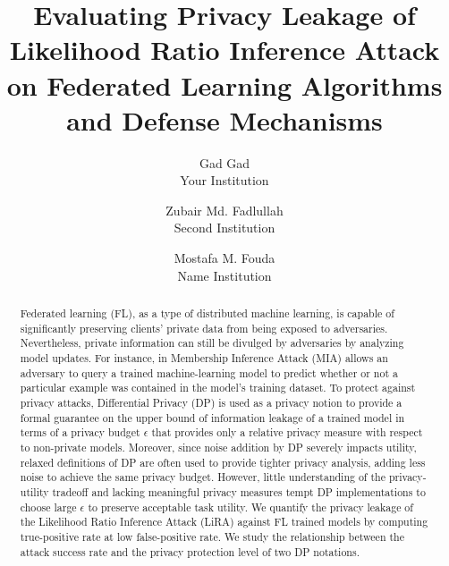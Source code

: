 \usepackage{amssymb}




\date{}

\title{\Large \bf Evaluating Privacy Leakage of Likelihood Ratio Inference Attack on Federated Learning Algorithms and Defense Mechanisms}

\author{
{\rm Gad Gad}\\
Your Institution
\and
{\rm Zubair Md. Fadlullah}\\
Second Institution
\and
{\rm Mostafa M. Fouda}\\
Name Institution
} %

\maketitle

\begin{abstract}
Federated learning (FL), as a type of distributed machine learning, is capable of significantly preserving clients’ private data from being exposed to adversaries. Nevertheless, private information can still be divulged by adversaries by analyzing model updates. For instance, in Membership Inference Attack (MIA) allows an adversary to query a trained machine-learning model to predict whether or not a particular example was contained in the model’s training dataset. To protect against privacy attacks, Differential Privacy (DP) is used as a privacy notion to provide a formal guarantee on the upper bound of information leakage of a trained model in terms of a privacy budget $\epsilon$ that provides only a relative privacy measure with respect to non-private models. Moreover, since noise addition by DP severely impacts utility, relaxed definitions of DP are often used to provide tighter privacy analysis, adding less noise to achieve the same privacy budget. However, little understanding of the privacy-utility tradeoff and lacking meaningful privacy measures tempt DP implementations to choose large $\epsilon$ to preserve acceptable task utility. We quantify the privacy leakage of the Likelihood Ratio Inference Attack (LiRA) against FL trained models by computing true-positive rate at low false-positive rate. We study the relationship between the attack success rate and the privacy protection level of two DP notations.  
\end{abstract}


